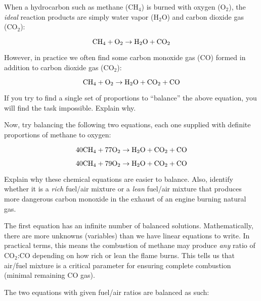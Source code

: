 

When a hydrocarbon such as methane (CH$_{4}$) is burned with oxygen (O$_{2}$), the {\it ideal} reaction products are simply water vapor (H$_{2}$O) and carbon dioxide gas (CO$_{2}$):

$$\hbox{CH}_4 + \hbox{O}_2 \to \hbox{H}_2\hbox{O} + \hbox{CO}_2$$

However, in practice we often find some carbon monoxide gas (CO) formed in addition to carbon dioxide gas (CO$_{2}$):

$$\hbox{CH}_4 + \hbox{O}_2 \to \hbox{H}_2\hbox{O} + \hbox{CO}_2 + \hbox{CO}$$

If you try to find a single set of proportions to ``balance'' the above equation, you will find the task impossible.  Explain why.

\vskip 10pt

Now, try balancing the following two equations, each one supplied with definite proportions of methane to oxygen:

$$40\hbox{CH}_4 + 77\hbox{O}_2 \to \hbox{H}_2\hbox{O} + \hbox{CO}_2 + \hbox{CO}$$

$$40\hbox{CH}_4 + 79\hbox{O}_2 \to \hbox{H}_2\hbox{O} + \hbox{CO}_2 + \hbox{CO}$$

Explain why these chemical equations are easier to balance.  Also, identify whether it is a {\it rich} fuel/air mixture or a {\it lean} fuel/air mixture that produces more dangerous carbon monoxide in the exhaust of an engine burning natural gas.







The first equation has an infinite number of balanced solutions.  Mathematically, there are more unknowns (variables) than we have linear equations to write.  In practical terms, this means the combustion of methane may produce {\it any} ratio of CO$_{2}$:CO depending on how rich or lean the flame burns.  This tells us that air/fuel mixture is a critical parameter for ensuring complete combustion (minimal remaining CO gas).

\vskip 10pt

The two equations with given fuel/air ratios are balanced as such:

